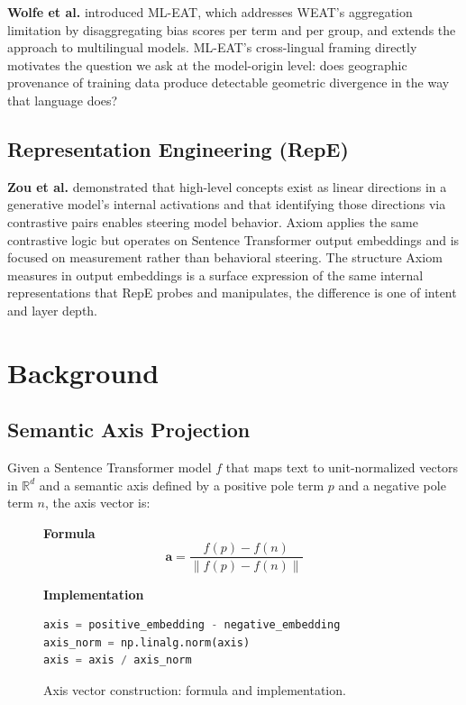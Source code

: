\documentclass[11pt, letterpaper]{article}
\begin{document}
\textbf{Wolfe et al.} \cite{wolfe2022} introduced ML-EAT, which addresses WEAT's aggregation limitation by disaggregating bias scores per term and per group, and extends the approach to multilingual models. ML-EAT's cross-lingual framing directly motivates the question we ask at the model-origin level: does geographic provenance of training data produce detectable geometric divergence in the way that language does?

\subsection{Representation Engineering (RepE)}

\textbf{Zou et al.} \cite{zou2023} demonstrated that high-level concepts exist as linear directions in a generative model's internal activations and that identifying those directions via contrastive pairs enables steering model behavior. Axiom applies the same contrastive logic but operates on Sentence Transformer output embeddings and is focused on measurement rather than behavioral steering. The structure Axiom measures in output embeddings is a surface expression of the same internal representations that RepE probes and manipulates, the difference is one of intent and layer depth.


\section{Background}

\subsection{Semantic Axis Projection}

Given a Sentence Transformer model $f$ that maps text to unit-normalized vectors in $\mathbb{R}^d$ and a semantic axis defined by a positive pole term $p$ and a negative pole term $n$, the axis vector is:

\begin{figure}[H]
  \centering
  \begin{minipage}[t]{0.25\textwidth}
    \vspace{0pt}
    \textbf{Formula}
    \[
      \mathbf{a} = \frac{f(p) - f(n)}{\|f(p) - f(n)\|}
    \]
  \end{minipage}
  \hfill
  \begin{minipage}[t]{0.65\textwidth}
    \vspace{0pt}
    \textbf{Implementation}
\begin{lstlisting}[language=Python]
axis = positive_embedding - negative_embedding
axis_norm = np.linalg.norm(axis)
axis = axis / axis_norm
\end{lstlisting}

  \end{minipage}
  \caption{Axis vector construction: formula and implementation.}
  \label{fig:axis_construction}
\end{figure}
\end{document}
